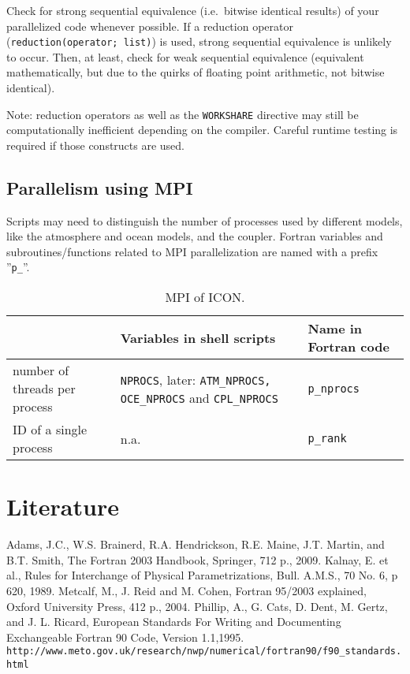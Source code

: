 \documentclass[a4paper,11pt,DIV16,BCOR1cm,titlepage]{scrartcl}
\begin{document}
\begin{itemize}
{\color{red}
\item Check for strong sequential equivalence (i.e.\ bitwise identical results) of your 
parallelized code whenever possible. If a reduction operator (\texttt{reduction(operator; list)}) 
is used, strong sequential equivalence is unlikely to occur. Then, at least, check for weak 
sequential equivalence (equivalent mathematically, but due to the quirks of floating 
point arithmetic, not bitwise identical).}

\item Note: reduction operators as well as the \texttt{WORKSHARE} directive may still be 
computationally inefficient depending on the compiler. Careful runtime testing is required if 
those constructs are used.
\end{itemize}


\subsection{Parallelism using MPI}

Scripts may need to distinguish the number of processes used by different models, like the 
atmosphere and ocean models, and the coupler. Fortran variables and subroutines/functions 
related to MPI parallelization are named with a prefix ''\texttt{p\_}''.

\begin{table}[htb]
\renewcommand{\arraystretch}{1.4}
\begin{center}
\begin{tabular}{|p{5cm}|p{7 cm}|p{3cm}|}
\hline
\textbf{ }  & \textbf{Variables in shell scripts}  & \textbf{Name in Fortran code} \\ 
\hline\hline
number of threads per process & \texttt{NPROCS}, later: \texttt{ATM\_NPROCS, OCE\_NPROCS} and \texttt{CPL\_NPROCS} & \texttt{p\_nprocs} \\ 
ID of a single process     & n.a. & \texttt{p\_rank} \\ 
\hline
\end{tabular}
\caption{MPI of ICON.}\label{tbl_MPI}
\end{center}
\end{table}

\section{Literature}  
%
Adams, J.C., W.S. Brainerd, R.A. Hendrickson, R.E. Maine, J.T. Martin, and B.T. Smith,
The Fortran 2003 Handbook, Springer, 712 p., 2009.
%
Kalnay, E. et al., Rules for Interchange of Physical Parametrizations,   
Bull. A.M.S., 70 No. 6, p 620, 1989.  
%
Metcalf, M., J. Reid and M. Cohen, Fortran 95/2003 explained, 
Oxford University Press, 412 p., 2004.
%
Phillip, A., G. Cats, D. Dent, M. Gertz, and J. L. Ricard,  
European Standards For Writing and Documenting Exchangeable Fortran 90  
Code, Version 1.1,1995.\\  
\texttt{http://www.meto.gov.uk/research/nwp/numerical/fortran90/f90\_standards.html}  
 
\end{document}
